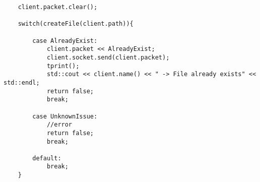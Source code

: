 \begin{lstlisting}
    client.packet.clear();

    switch(createFile(client.path)){
        
        case AlreadyExist:
            client.packet << AlreadyExist;
            client.socket.send(client.packet);
            tprint();
            std::cout << client.name() << " -> File already exists" << std::endl;
            return false;
            break;

        case UnknownIssue:
            //error
            return false;
            break;

        default:
            break;
    }
\end{lstlisting}